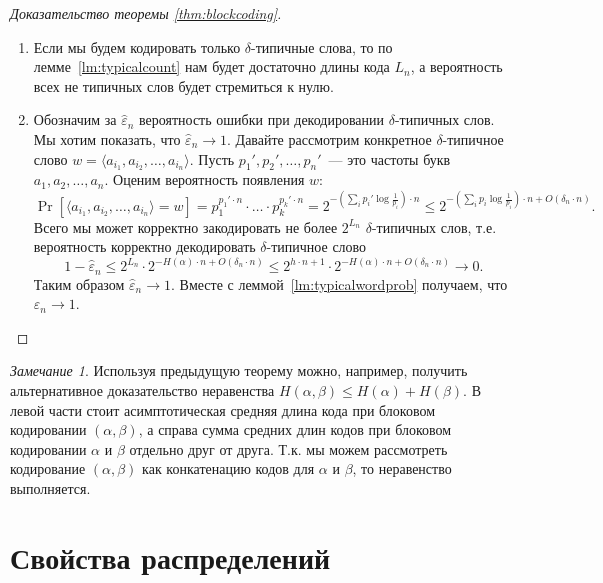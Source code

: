 \documentclass[12pt]{article}
\newcommand{\seqn}[2]{{#1}_1,{#1}_2,\dotsc,{#1}_{#2}}
\newcommand{\seqin}[3]{{#1}_{{#2}_1},{#1}_{{#2}_2},\dotsc,{#1}_{{#2}_{#3}}}
\theoremstyle{definition}
\theoremstyle{plain}
\theoremstyle{remark}
\newtheorem{remark}{Замечание}[section]
\begin{document}
\begin{proof}[Доказательство теоремы \ref{thm:blockcoding}] \mbox{}
    \begin{enumerate} 
    \item Если мы будем кодировать только $\delta$-типич\-ные слова, то по
    лемме~\ref{lm:typicalcount} нам будет достаточно длины кода $L_n$, а
    вероятность всех не типичных слов будет стремиться к нулю.

    \item Обозначим за $\hat\varepsilon_n$ вероятность ошибки при декодировании
         $\delta$-типичных слов.
        Мы хотим показать, что $\hat\varepsilon_n\to1$.  
        Давайте рассмотрим конкретное $\delta$-типичное слово
        $w=\langle\seqin{a}{i}{n}\rangle$. Пусть $p_1', p_2',\dotsc,p_n'$~---
        это частоты букв $\seqn{a}{n}$.
        Оценим вероятность появления $w$:
        \[
            \Pr[\langle\seqin{a}{i}{n}\rangle = w] = 
            p_1^{p_1'\cdot n} \cdot \dotsc \cdot p_k^{p_k'\cdot n} 
            =   2^{-(\sum_i p_i'\log\frac{1}{p_i})\cdot n}
            \le 2^{-(\sum_i p_i\log\frac{1}{p_i})\cdot n + O(\delta_n\cdot n)}.
        \]
        Всего мы может корректно закодировать не более $2^{L_n}$
        $\delta$-типичных слов, т.е. вероятность корректно декодировать
        $\delta$-типичное слово
        \[
            1 - \hat\varepsilon_n \le 2^{L_n}\cdot 2^{-H(\alpha)\cdot n + O(\delta_n\cdot n)} \le
            2^{h\cdot n + 1}\cdot 2^{-H(\alpha)\cdot n + O(\delta_n\cdot n)} 
            \to 0.
        \]
        Таким образом $\hat\varepsilon_n\to1$. Вместе с
        леммой~\ref{lm:typicalwordprob} получаем, что $\varepsilon_n\to1$.

    \end{enumerate}
\end{proof}
\begin{remark}
    Используя предыдущую теорему можно, например, получить альтернативное
    доказательство неравенства $H(\alpha,\beta)\le H(\alpha) + H(\beta).$ В
    левой части стоит асимптотическая средняя длина кода при блоковом
    кодировании $(\alpha,\beta)$, а справа сумма средних длин кодов
    при блоковом кодировании $\alpha$ и $\beta$ отдельно друг от друга. Т.к. мы
    можем рассмотреть кодирование $(\alpha,\beta)$ как конкатенацию кодов для
    $\alpha$ и $\beta$, то неравенство выполняется.
\end{remark}

\section{Свойства распределений}
\end{document}
